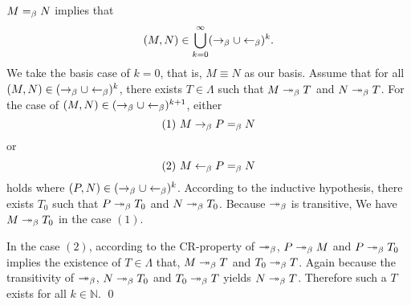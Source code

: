 \begin{pf} \rm
  $M=_{\beta} N$ implies that 
\[
(M,N)\in
\bigcup_{k=0}^{\infty} (\rightarrow_{\beta} \cup \leftarrow_\beta)^k.
\]
We take the basis case of $k=0$, that is, $M\equiv N$ as our basis.
Assume that for all $(M,N)\in (\rightarrow_{\beta} \cup \leftarrow_\beta)^k$, there exists
$T\in\Lambda$ such that $M\twoheadrightarrow_{\beta} T$ and $N\twoheadrightarrow_{\beta} T$. For the case of
$(M,N)\in (\rightarrow_{\beta} \cup \leftarrow_\beta)^{k+1}$, either
\[
 (1)~ M\rightarrow_{\beta} P =_{\beta} N
\]
or
\[
 (2)~ M\leftarrow_\beta P=_{\beta} N
\]
holds where $(P,N)\in (\rightarrow_{\beta} \cup \leftarrow_\beta)^k$.
According to the inductive hypothesis, there exists $T_0$ such that
$P\twoheadrightarrow_{\beta} T_0$ and $N\twoheadrightarrow_{\beta} T_0$. Because $\twoheadrightarrow_{\beta}$
is transitive, We have $M\twoheadrightarrow_{\beta} T_0$ in the case $(1)$.

In the case $(2)$, according to the CR-property of $\twoheadrightarrow_{\beta}$,
$P\twoheadrightarrow_{\beta} M$ and $P\twoheadrightarrow_{\beta} T_0$ implies the existence of
$T\in\Lambda$ that, $M\twoheadrightarrow_{\beta} T$ and $T_0\twoheadrightarrow_{\beta} T$.
Again because the transitivity of $\twoheadrightarrow_{\beta}$, $N\twoheadrightarrow_{\beta} T_0$ and
$T_0\twoheadrightarrow_{\beta} T$ yields $N\twoheadrightarrow_{\beta} T$.
Therefore such a $T$ exists for all $k\in\mathbb{N}$.
 \qed
\end{pf}
